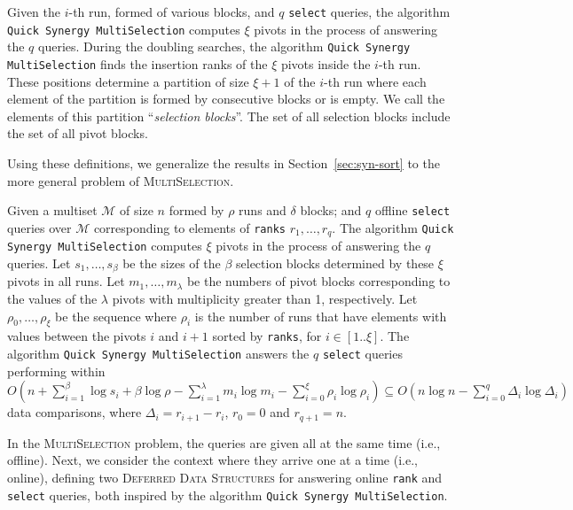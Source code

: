 \begin{INUTILE}
  \begin{definition}
    Given the $i$-th run, formed of various blocks, and $q$
    \texttt{select} queries, the algorithm \texttt{Quick Synergy
      MultiSelection} computes $\xi$ pivots in the process of
    answering the $q$ queries. During the doubling searches, the
    algorithm \texttt{Quick Synergy MultiSelection} finds the
    insertion ranks of the $\xi$ pivots inside the $i$-th run. These
    positions determine a partition of size $\xi+1$ of the $i$-th run
    where each element of the partition is formed by consecutive
    blocks or is empty. We call the elements of this partition
    ``\emph{selection blocks}''. The set of all selection blocks
    include the set of all pivot blocks.
  \end{definition}

Using these definitions, we generalize the results in Section~\ref{sec:syn-sort} to the more general problem of \textsc{MultiSelection}.

\begin{theorem}\label{theo:qsms}
  Given a multiset $\mathcal{M}$ of size $n$ formed by $\rho$ runs and
  $\delta$ blocks; and $q$ offline \texttt{select} queries over
  $\mathcal{M}$ corresponding to elements of \texttt{ranks}
  $r_1, \dots, r_q$. The algorithm \texttt{Quick Synergy
    MultiSelection} computes $\xi$ pivots in the process of answering
  the $q$ queries. Let $s_1,\dots, s_{\beta}$ be the sizes of the
  $\beta$ selection blocks determined by these $\xi$ pivots in all
  runs. Let $m_1, \dots, m_\lambda$ be the numbers of pivot blocks
  corresponding to the values of the $\lambda$ pivots with
  multiplicity greater than 1, respectively.  Let
  $\rho_0, \dots, \rho_\xi$ be the sequence where $\rho_i$ is the
  number of runs that have elements with values between the pivots $i$
  and $i+1$ sorted by \texttt{ranks}, for $i\in[1..\xi]$.  The
  algorithm \texttt{Quick Synergy MultiSelection} answers the $q$
  \texttt{select} queries performing within
  $O(n + \sum^{\beta}_{i=1}\log{s_i} +
    \beta\log{\rho}-\sum^{\lambda}_{i=1}m_i\log{m_i} -
    \sum^{\xi}_{i=0}\rho_i\log{\rho_i}) \subseteq
  O(n\log{n} - \sum^{q}_{i=0}\Delta_i\log{\Delta_i})$ data
  comparisons, where $\Delta_i = r_{i+1} - r_i$, $r_0=0$ and
  $r_{q+1}=n$.
\end{theorem}
\end{INUTILE}

In the \textsc{MultiSelection} problem, the queries are given all at
the same time (i.e., offline). Next, we consider the context where
they arrive one at a time (i.e., online), defining two
\textsc{Deferred Data Structures} for answering online \texttt{rank}
and \texttt{select} queries, both inspired by the algorithm
\texttt{Quick Synergy MultiSelection}.

